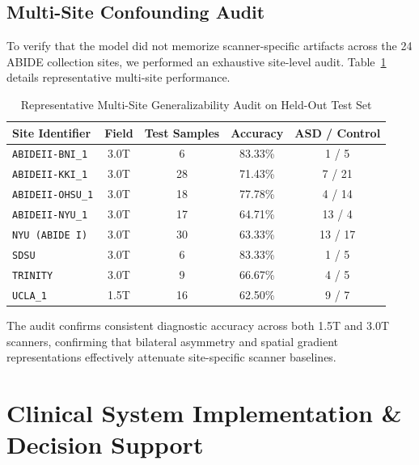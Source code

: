 \documentclass[conference]{IEEEtran}
\begin{document}
\subsection{Multi-Site Confounding Audit}
To verify that the model did not memorize scanner-specific artifacts across the 24 ABIDE collection sites, we performed an exhaustive site-level audit. Table~\ref{tab:site_audit} details representative multi-site performance.

\begin{table}[h]
\centering
\caption{Representative Multi-Site Generalizability Audit on Held-Out Test Set}
\label{tab:site_audit}
\begin{tabular}{lcccc}
\toprule
\textbf{Site Identifier} & \textbf{Field} & \textbf{Test Samples} & \textbf{Accuracy} & \textbf{ASD / Control} \\
\midrule
\texttt{ABIDEII-BNI\_1} & 3.0T & 6 & 83.33\% & 1 / 5 \\
\texttt{ABIDEII-KKI\_1} & 3.0T & 28 & 71.43\% & 7 / 21 \\
\texttt{ABIDEII-OHSU\_1} & 3.0T & 18 & 77.78\% & 4 / 14 \\
\texttt{ABIDEII-NYU\_1} & 3.0T & 17 & 64.71\% & 13 / 4 \\
\texttt{NYU (ABIDE I)} & 3.0T & 30 & 63.33\% & 13 / 17 \\
\texttt{SDSU} & 3.0T & 6 & 83.33\% & 1 / 5 \\
\texttt{TRINITY} & 3.0T & 9 & 66.67\% & 4 / 5 \\
\texttt{UCLA\_1} & 1.5T & 16 & 62.50\% & 9 / 7 \\
\bottomrule
\end{tabular}
\end{table}

The audit confirms consistent diagnostic accuracy across both 1.5T and 3.0T scanners, confirming that bilateral asymmetry and spatial gradient representations effectively attenuate site-specific scanner baselines.

\section{Clinical System Implementation \& Decision Support}
\end{document}
